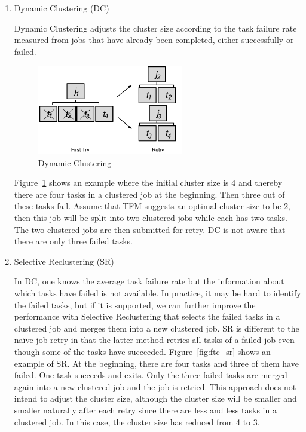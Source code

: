 \begin{enumerate}
\item{Dynamic Clustering (DC)}

Dynamic Clustering adjusts the cluster size according to the task failure rate measured from jobs that have already been completed, either successfully or failed. 

\begin{figure}[h!]
	\centering
    \includegraphics[width=0.6\textwidth]{figures/tolerance/ftc_dc.pdf}
    \caption{Dynamic Clustering}
    \label{fig:ftc_dc}
\end{figure}


Figure~\ref{fig:ftc_dc} shows an example where the initial cluster size is 4 and thereby there are four tasks in a clustered job at the beginning. Then three out of these tasks fail. Assume that TFM suggests an optimal cluster size to be 2, then this job will be split into two clustered jobs while each has two tasks. The two clustered jobs are then submitted for retry.  DC is not aware that there are only three failed tasks. 

\item{Selective Reclustering (SR)}

In DC, one knows the average task failure rate but the information about which tasks have failed is not available. In practice, it may be hard to identify the failed tasks, but if it is supported, we can further improve the performance with Selective Reclustering that selects the failed tasks in a clustered job and merges them into a new clustered job. SR is different to the naïve job retry in that the latter method retries all tasks of a failed job even though some of the tasks have succeeded. 
Figure~\ref{fig:ftc_sr} shows an example of SR. At the beginning, there are four tasks and three of them have failed. One task succeeds and exits. Only the three failed tasks are merged again into a new clustered job and the job is retried. This approach does not intend to adjust the cluster size, although the cluster size will be smaller and smaller naturally after each retry since there are less and less tasks in a clustered job. In this case, the cluster size has reduced from 4 to 3.


\end{enumerate}
